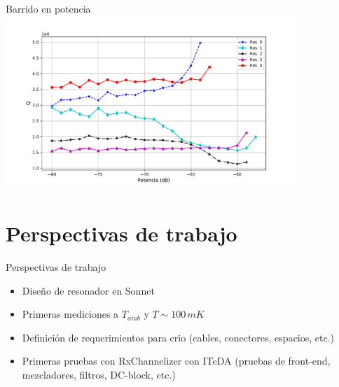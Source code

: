 \documentclass[ignorenonframetext,12pt]{beamer}
\begin{document}
\begin{frame}{Barrido en potencia}
				\centering
												\includegraphics[width=0.82\textwidth]{Q_vs_P_tot}

\end{frame}


\section{Perspectivas de trabajo}
\begin{frame}{Perspectivas de trabajo}
				\begin{itemize}
								\item Dise\~no de resonador en Sonnet
								\item Primeras mediciones a $T_{amb}$ y $T \sim 100\,mK$
								\item Definici\'on de requerimientos para crio (cables,
												conectores, espacios, etc.)
								\item Primeras pruebas con RxChannelizer con ITeDA (pruebas de
												front-end, mezcladores, filtros, DC-block, etc.)
				\end{itemize}
\end{frame}
\end{document}
